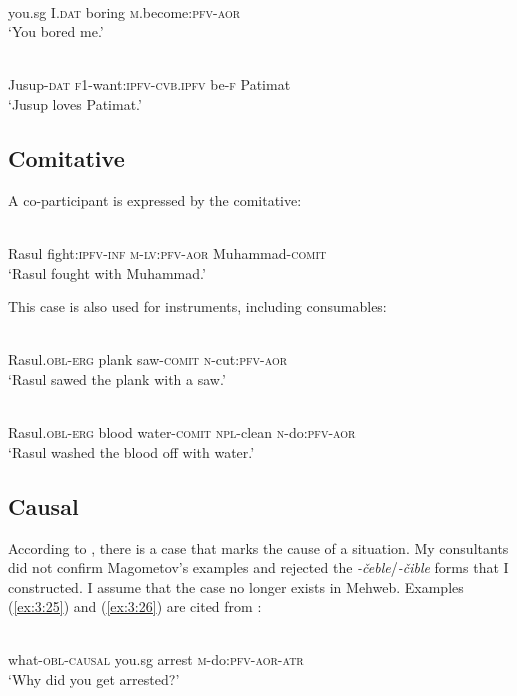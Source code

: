 ﻿\documentclass[output=paper]{langsci/langscibook}
\begin{document}
\ea
{}\\
you.sg I.\textsc{dat} boring \textsc{m}.become:\textsc{pfv}-\textsc{aor}\\
\glt `You bored me.'

\ex
{}\\
Jusup-\textsc{dat} \textsc{f1}-want:\textsc{ipfv}-\textsc{cvb.ipfv} be-\textsc{f} Patimat\\
\glt `Jusup loves Patimat.'
\z

\subsection{Comitative}\label{comitative}

A co-participant is expressed by the comitative:

\ea
{}\\
Rasul fight:\textsc{ipfv}-\textsc{inf} \textsc{m}-\textsc{lv:pfv}-\textsc{aor}  Muhammad-\textsc{comit}\\
\glt `Rasul fought with Muhammad.'
\z

This case is also used for instruments, including consumables:

\ea
{}\\
Rasul.\textsc{obl}-\textsc{erg} plank saw-\textsc{comit} \textsc{n}-cut:\textsc{pfv}-\textsc{aor}\\
\glt `Rasul sawed the plank with a saw.'

\ex
{}\\
Rasul.\textsc{obl}-\textsc{erg} blood water-\textsc{comit} \textsc{npl}-clean \textsc{n}-do:\textsc{pfv}-\textsc{aor}\\
\glt `Rasul washed the blood off with water.'
\z

\subsection{Causal}\label{causal}

According to \citet{magometov1982}, there is a case that marks the cause of a
situation. My consultants did not confirm Magometov's examples and
rejected the \emph{-čeble}/\mbox{\emph{-čible}} forms that I constructed. I assume
that the case no longer exists in Mehweb. Examples (\ref{ex:3:25}) and (\ref{ex:3:26}) are
cited from \citet[49]{magometov1982}:

\ea \label{ex:3:25}
\\
what-\textsc{obl}-\textsc{causal} you.sg arrest \textsc{m}-do:\textsc{pfv}-\textsc{aor}-\textsc{atr}\\
\glt `Why did you get arrested?'
\end{document}
